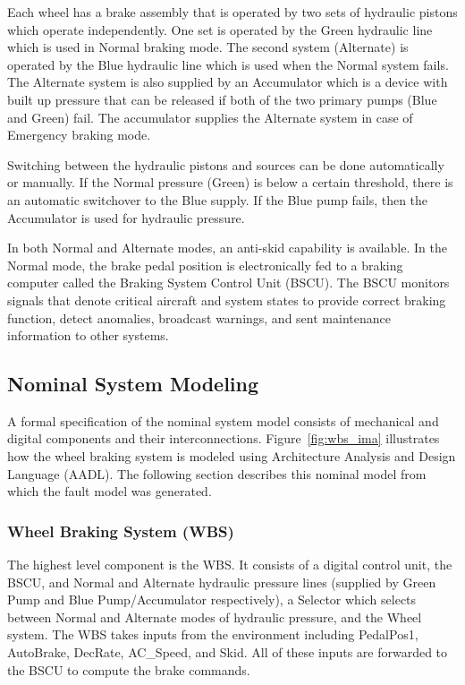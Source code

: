 Each wheel has a brake assembly that is operated by two sets of hydraulic pistons which operate independently. One set is operated by the Green hydraulic line which is used in Normal braking mode. The second system (Alternate) is operated by the Blue hydraulic line which is used when the Normal system fails. The Alternate system is also supplied by an Accumulator which is a device with built up pressure that can be released if both of the two primary pumps (Blue and Green) fail. The accumulator supplies the Alternate system in case of Emergency braking mode.

Switching between the hydraulic pistons and sources can be done automatically or manually. If the Normal pressure (Green) is below a certain threshold, there is an automatic switchover to the Blue supply. If the Blue pump fails, then the Accumulator is used for hydraulic pressure.

In both Normal and Alternate modes, an anti-skid capability is available. In the Normal mode, the brake pedal position is electronically fed to a braking computer called the Braking System Control Unit (BSCU). The BSCU monitors signals that denote critical aircraft and system states to provide correct braking function, detect anomalies, broadcast warnings, and sent maintenance information to other systems.

\subsection{Nominal System Modeling}
A formal specification of the nominal system model consists of mechanical and digital components and their interconnections. Figure~\ref{fig:wbs_ima} illustrates how the wheel braking system is modeled using Architecture Analysis and Design Language (AADL). The following section describes this nominal model from which the fault model was generated.

\subsubsection{Wheel Braking System (WBS)}
The highest level component is the WBS. It consists of a digital control unit, the BSCU, and Normal and Alternate hydraulic pressure lines (supplied by Green Pump and Blue Pump/Accumulator respectively), a Selector which selects between Normal and Alternate modes of hydraulic pressure, and the Wheel system. The WBS takes inputs from the environment including PedalPos1, AutoBrake, DecRate, AC\_Speed, and Skid. All of these inputs are forwarded to the BSCU to compute the brake commands.

